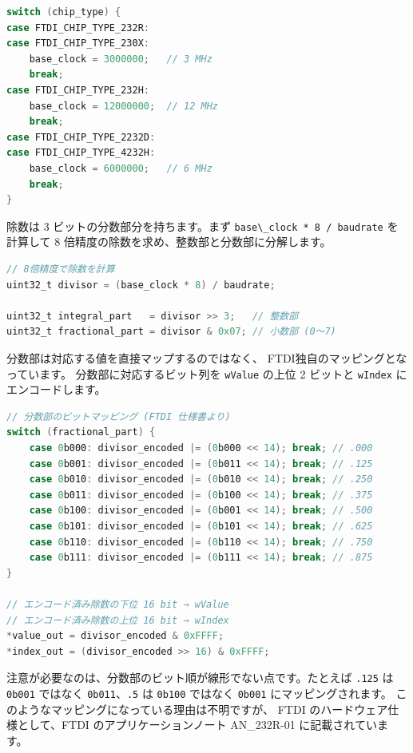 \documentclass[10pt,twoside,openany,a4j]{ltjsbook}
\newcommand{\passthrough}[1]{#1}
\begin{document}
\begin{lstlisting}[language=C]
switch (chip_type) {
case FTDI_CHIP_TYPE_232R:
case FTDI_CHIP_TYPE_230X:
    base_clock = 3000000;   // 3 MHz
    break;
case FTDI_CHIP_TYPE_232H:
    base_clock = 12000000;  // 12 MHz
    break;
case FTDI_CHIP_TYPE_2232D:
case FTDI_CHIP_TYPE_4232H:
    base_clock = 6000000;   // 6 MHz
    break;
}
\end{lstlisting}

除数は 3 ビットの分数部分を持ちます。まず
\passthrough{\lstinline!base\_clock * 8 / baudrate!} を計算して 8
倍精度の除数を求め、整数部と分数部に分解します。

\begin{lstlisting}[language=C]
// 8倍精度で除数を計算
uint32_t divisor = (base_clock * 8) / baudrate;

uint32_t integral_part   = divisor >> 3;   // 整数部
uint32_t fractional_part = divisor & 0x07; // 小数部 (0〜7)
\end{lstlisting}

分数部は対応する値を直接マップするのではなく、
FTDI独自のマッピングとなっています。 分数部に対応するビット列を
\passthrough{\lstinline!wValue!} の上位 2 ビットと
\passthrough{\lstinline!wIndex!} にエンコードします。

\begin{lstlisting}[language=C]
// 分数部のビットマッピング (FTDI 仕様書より)
switch (fractional_part) {
    case 0b000: divisor_encoded |= (0b000 << 14); break; // .000
    case 0b001: divisor_encoded |= (0b011 << 14); break; // .125
    case 0b010: divisor_encoded |= (0b010 << 14); break; // .250
    case 0b011: divisor_encoded |= (0b100 << 14); break; // .375
    case 0b100: divisor_encoded |= (0b001 << 14); break; // .500
    case 0b101: divisor_encoded |= (0b101 << 14); break; // .625
    case 0b110: divisor_encoded |= (0b110 << 14); break; // .750
    case 0b111: divisor_encoded |= (0b111 << 14); break; // .875
}

// エンコード済み除数の下位 16 bit → wValue
// エンコード済み除数の上位 16 bit → wIndex
*value_out = divisor_encoded & 0xFFFF;
*index_out = (divisor_encoded >> 16) & 0xFFFF;
\end{lstlisting}

注意が必要なのは、分数部のビット順が線形でない点です。たとえば
\passthrough{\lstinline!.125!} は \passthrough{\lstinline!0b001!}
ではなく \passthrough{\lstinline!0b011!}、\passthrough{\lstinline!.5!}
は \passthrough{\lstinline!0b100!} ではなく
\passthrough{\lstinline!0b001!} にマッピングされます。
このようなマッピングになっている理由は不明ですが、 FTDI
のハードウェア仕様として、FTDI のアプリケーションノート AN\_232R-01
に記載されています。
\end{document}

